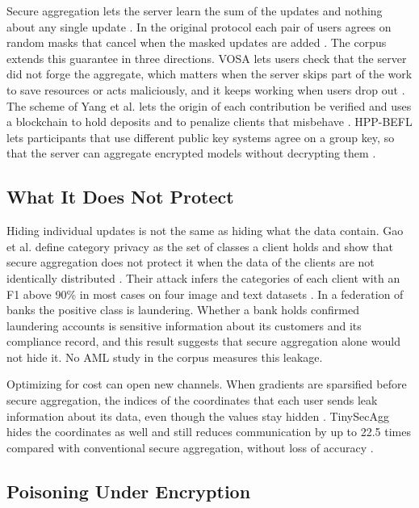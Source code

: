 \documentclass[journal]{IEEEtran}
\begin{document}
Secure aggregation lets the server learn the sum of the updates and nothing about any single update \cite{bonawitz2017secagg}. In the original protocol each pair of users agrees on random masks that cancel when the masked updates are added \cite{sami2024tinysecagg}. The corpus extends this guarantee in three directions. VOSA lets users check that the server did not forge the aggregate, which matters when the server skips part of the work to save resources or acts maliciously, and it keeps working when users drop out \cite{wang2023vosa}. The scheme of Yang et al. lets the origin of each contribution be verified and uses a blockchain to hold deposits and to penalize clients that misbehave \cite{yang2022accountable}. HPP-BEFL lets participants that use different public key systems agree on a group key, so that the server can aggregate encrypted models without decrypting them \cite{xiong2025hppbefl}.

\subsection{What It Does Not Protect}

Hiding individual updates is not the same as hiding what the data contain. Gao et al. define category privacy as the set of classes a client holds and show that secure aggregation does not protect it when the data of the clients are not identically distributed \cite{gao2023category}. Their attack infers the categories of each client with an F1 above 90\% in most cases on four image and text datasets \cite{gao2023category}. In a federation of banks the positive class is laundering. Whether a bank holds confirmed laundering accounts is sensitive information about its customers and its compliance record, and this result suggests that secure aggregation alone would not hide it. No AML study in the corpus measures this leakage.

Optimizing for cost can open new channels. When gradients are sparsified before secure aggregation, the indices of the coordinates that each user sends leak information about its data, even though the values stay hidden \cite{sami2024tinysecagg}. TinySecAgg hides the coordinates as well and still reduces communication by up to 22.5 times compared with conventional secure aggregation, without loss of accuracy \cite{sami2024tinysecagg}.

\subsection{Poisoning Under Encryption}
\end{document}
